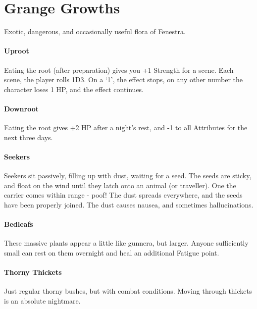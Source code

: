 \chapter{Grange Growths}

\begin{multicols}{2}

Exotic, dangerous, and occasionally useful flora of Fenestra.

\subsubsection{Uproot}

Eating the root (after preparation) gives you +1 Strength for a scene.
Each scene, the player rolls 1D3.
On a `1', the effect stops, on any other number the character loses 1 HP, and the effect continues.

\subsubsection{Downroot}

Eating the root gives +2 HP after a night's rest, and -1 to all Attributes for the next three days.

\subsubsection{Seekers}

Seekers sit passively, filling up with dust, waiting for a seed.
The seeds are sticky, and float on the wind until they latch onto an animal (or traveller).
One the carrier comes within range - poof!
The dust spreads everywhere, and the seeds have been properly joined.
The dust causes nausea, and sometimes hallucinations.

\subsubsection{Bedleafs}

These massive plants appear a little like gunnera, but larger.
Anyone sufficiently small can rest on them overnight and heal an additional Fatigue point.

\subsubsection{Thorny Thickets}

Just regular thorny bushes, but with combat conditions.
Moving through thickets is an absolute nightmare.


\end{multicols}
